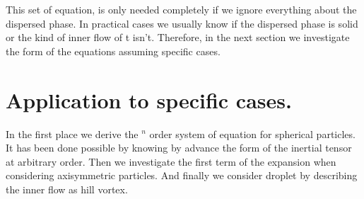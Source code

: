 {This set of equation, is only needed completely if we ignore everything about the dispersed phase.
In practical cases we usually know if the dispersed phase is solid or the kind of inner flow of t isn't.  
Therefore, in the next section we investigate the form of the equations assuming specific cases. 
\section{Application to specific cases.}

In the first place we derive the $^n$ order system of equation for spherical particles. 
It has been done possible by knowing by advance the form of the inertial tensor at arbitrary order. 
Then we investigate the first term of the expansion when considering axisymmetric particles. 
And finally we consider droplet by describing the inner flow as hill vortex. 

}
